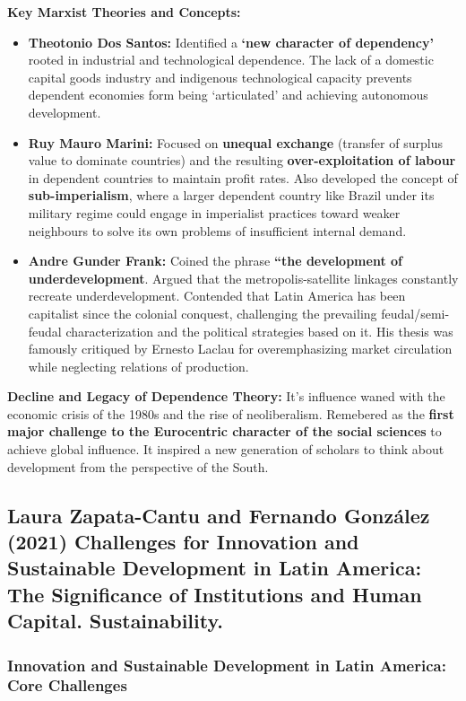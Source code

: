 \documentclass{article}
\begin{document}
    \noindent \textbf{Key Marxist Theories and Concepts:}
    \begin{itemize}
        \item \textbf{Theotonio Dos Santos:} Identified a
        \textbf{`new character of dependency'} rooted in industrial and
        technological dependence. The lack of a domestic capital goods
        industry and indigenous technological capacity prevents dependent
        economies form being `articulated' and achieving autonomous development.
        \item \textbf{Ruy Mauro Marini:} Focused on \textbf{unequal exchange} (transfer of surplus value to dominate countries) and the resulting \textbf{over-exploitation of labour} in dependent countries to maintain profit rates. Also developed the concept of \textbf{sub-imperialism}, where a larger dependent country like Brazil under its military regime could engage in imperialist practices toward weaker neighbours to solve its own problems of insufficient internal demand.
        \item \textbf{Andre Gunder Frank:} Coined the phrase
        \textbf{``the development of underdevelopment}. Argued that the
        metropolis-satellite linkages constantly recreate underdevelopment.
        Contended that Latin America has been capitalist since the colonial
        conquest, challenging the prevailing feudal/semi-feudal
        characterization and the political strategies based on it. His
        thesis was famously critiqued by Ernesto Laclau for overemphasizing
        market circulation while neglecting relations of production.
    \end{itemize}

    \noindent \textbf{Decline and Legacy of Dependence Theory:} It's
influence waned with the economic crisis of the 1980s and the rise of
neoliberalism. Remebered as the
\textbf{first major challenge to the Eurocentric character of the social sciences} to achieve global influence. It inspired a new generation of scholars to think about development from the perspective of the South.

\subsection{Laura Zapata-Cantu and Fernando González (2021) Challenges for Innovation and
Sustainable Development in Latin America: The Significance of Institutions and
Human Capital. Sustainability.}

    \subsubsection{Innovation and Sustainable Development in Latin America: Core Challenges}
\end{document}
